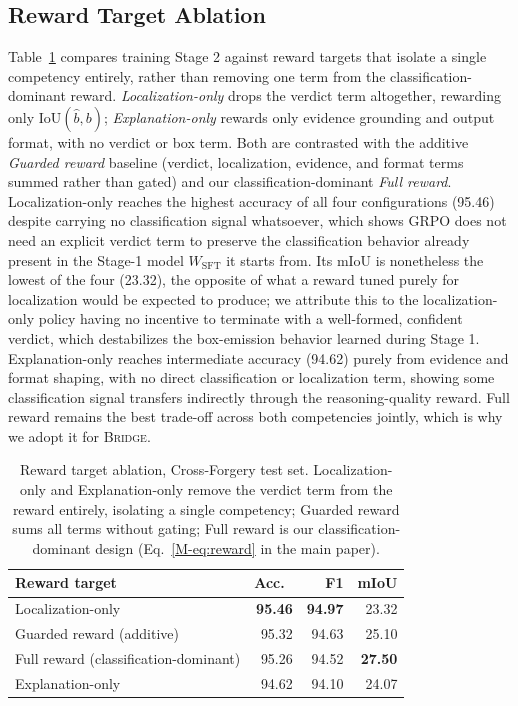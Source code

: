 \documentclass[10pt,twocolumn,letterpaper]{article}
\newcommand{\bridge}{\textsc{Bridge}}
\begin{document}
\subsection{Reward Target Ablation}
Table~\ref{tab:ablation-target} compares training Stage 2 against reward targets that isolate a single competency entirely, rather than removing one term from the classification-dominant reward. \emph{Localization-only} drops the verdict term altogether, rewarding only $\mathrm{IoU}(\hat b, b)$; \emph{Explanation-only} rewards only evidence grounding and output format, with no verdict or box term. Both are contrasted with the additive \emph{Guarded reward} baseline (verdict, localization, evidence, and format terms summed rather than gated) and our classification-dominant \emph{Full reward}. Localization-only reaches the highest accuracy of all four configurations (95.46) despite carrying no classification signal whatsoever, which shows GRPO does not need an explicit verdict term to preserve the classification behavior already present in the Stage-1 model $W_{\mathrm{SFT}}$ it starts from. Its mIoU is nonetheless the lowest of the four (23.32), the opposite of what a reward tuned purely for localization would be expected to produce; we attribute this to the localization-only policy having no incentive to terminate with a well-formed, confident verdict, which destabilizes the box-emission behavior learned during Stage 1. Explanation-only reaches intermediate accuracy (94.62) purely from evidence and format shaping, with no direct classification or localization term, showing some classification signal transfers indirectly through the reasoning-quality reward. Full reward remains the best trade-off across both competencies jointly, which is why we adopt it for \bridge{}.

\begin{table}[h]
\centering
\small
\caption{Reward target ablation, Cross-Forgery test set. Localization-only and Explanation-only remove the verdict term from the reward entirely, isolating a single competency; Guarded reward sums all terms without gating; Full reward is our classification-dominant design (Eq.~\ref{M-eq:reward} in the main paper).}
\label{tab:ablation-target}
\begin{tabular}{lrrr}
\toprule
Reward target & Acc.\ & F1 & mIoU \\
\midrule
Localization-only & \textbf{95.46} & \textbf{94.97} & 23.32 \\
Guarded reward (additive) & 95.32 & 94.63 & 25.10 \\
Full reward (classification-dominant) & 95.26 & 94.52 & \textbf{27.50} \\
Explanation-only & 94.62 & 94.10 & 24.07 \\
\bottomrule
\end{tabular}
\end{table}
\end{document}
